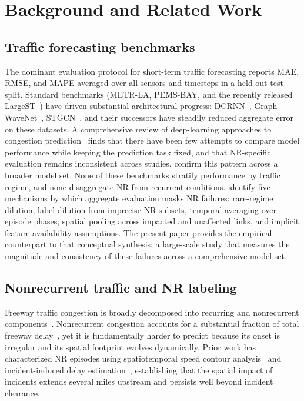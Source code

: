 \documentclass[a4paper]{cas-sc}
\begin{document}
\section{Background and Related Work}
\label{sec:background}

\subsection{Traffic forecasting benchmarks}

The dominant evaluation protocol for short-term traffic forecasting
reports MAE, RMSE, and MAPE averaged over all sensors and timesteps
in a held-out test split.
Standard benchmarks (METR-LA, PEMS-BAY, and the recently released
LargeST~\citep{liu2024largest}) have driven substantial architectural
progress: DCRNN~\citep{li2018dcrnn}, Graph WaveNet~\citep{wu2019gwnet},
STGCN~\citep{yu2018stgcn}, and their successors have steadily reduced
aggregate error on these datasets.
A comprehensive review of deep-learning approaches to congestion
prediction~\citep{kumar2021survey} finds that there have been few
attempts to compare model performance while keeping the prediction
task fixed, and that NR-specific evaluation remains inconsistent
across studies.
\citet{shaygan2022survey} confirm this
pattern across a broader model set.
None of these benchmarks stratify performance by traffic regime,
and none disaggregate NR from recurrent conditions.
\citet{bae2026why} identify five mechanisms by which aggregate evaluation
masks NR failures: rare-regime dilution, label dilution from imprecise
NR subsets, temporal averaging over episode phases, spatial pooling
across impacted and unaffected links, and implicit feature availability
assumptions.
The present paper provides the empirical counterpart to that conceptual
synthesis: a large-scale study that measures the magnitude and
consistency of these failures across a comprehensive model set.

\subsection{Nonrecurrent traffic and NR labeling}

Freeway traffic congestion is broadly decomposed into recurring and
nonrecurrent components~\citep{skabardonis2003, schrank2021}.
Nonrecurrent congestion accounts for a substantial fraction of total
freeway delay~\citep{fhwa2025}, yet it is fundamentally harder to
predict because its onset is irregular and its spatial footprint
evolves dynamically.
Prior work has characterized NR episodes using spatiotemporal
speed contour analysis~\citep{chen2016nonrecurrent} and incident-induced
delay estimation~\citep{chakraborty2019}, establishing that the spatial
impact of incidents extends several miles upstream and persists well
beyond incident clearance.
\end{document}
